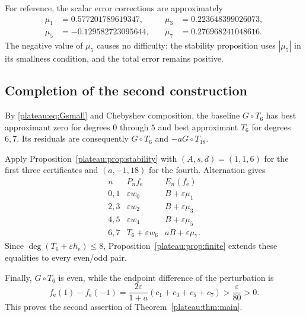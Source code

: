 \documentclass[11pt]{article}
\theoremstyle{remark}\newtheorem{remark}[theorem]{Remark}
\newcommand{\eps}{\varepsilon}
\begin{document}
For reference, the scalar error corrections are approximately
\begin{align*}
 \mu_1&=0.577201789619347,&\quad \mu_3&=0.223648399026073,\\
 \mu_5&=-0.129582723095644,&\quad \mu_7&=0.276968241048616.
\end{align*}
The negative value of $\mu_5$ causes no difficulty: the stability
proposition uses $|\mu_5|$ in its smallness condition, and the total error
remains positive.

\subsection{Completion of the second construction}

By \eqref{plateau:eq:Gsmall} and Chebyshev composition, the baseline
$G\circ T_6$ has best approximant zero for degrees $0$ through $5$ and
best approximant $T_6$ for degrees $6,7$. Its residuals are consequently
$G\circ T_6$ and $-aG\circ T_{18}$.

Apply Proposition~\ref{plateau:prop:stability} with
$(A,s,d)=(1,1,6)$ for the first three certificates and
$(a,-1,18)$ for the fourth. Alternation gives
\[
\begin{array}{c|c|c}
 n&P_n f_{\mathrm{e}}&E_n(f_{\mathrm{e}})\\\hline
 0,1&\eps w_0&B+\eps\mu_1\\
 2,3&\eps w_2&B+\eps\mu_3\\
 4,5&\eps w_4&B+\eps\mu_5\\
 6,7&T_6+\eps w_6&aB+\eps\mu_7.
\end{array}
\]
Since $\deg(T_6+\eps h_{\mathrm{e}})\le8$,
Proposition~\ref{plateau:prop:finite} extends these equalities to every even/odd
pair.

Finally, $G\circ T_6$ is even, while the endpoint difference of the
perturbation is
\begin{equation}\label{plateau:eq:evenwitness}
 f_{\mathrm{e}}(1)-f_{\mathrm{e}}(-1)
 =\frac{2\eps}{1+a}(c_1+c_3+c_5+c_7)
 >\frac{\eps}{80}>0.
\end{equation}
This proves the second assertion of Theorem~\ref{plateau:thm:main}.
\end{document}
